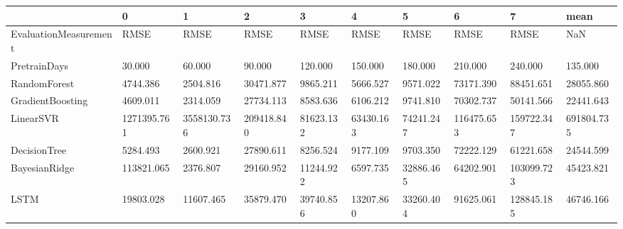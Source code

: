 \begin{tabular}{llllllllll}
\toprule
{} &           0 &           1 &          2 &         3 &         4 &         5 &          6 &          7 &       mean \\
\midrule
EvaluationMeasurement &        RMSE &        RMSE &       RMSE &      RMSE &      RMSE &      RMSE &       RMSE &       RMSE &        NaN \\
PretrainDays          &      30.000 &      60.000 &     90.000 &   120.000 &   150.000 &   180.000 &    210.000 &    240.000 &    135.000 \\
RandomForest          &    4744.386 &    2504.816 &  30471.877 &  9865.211 &  5666.527 &  9571.022 &  73171.390 &  88451.651 &  28055.860 \\
GradientBoosting      &    4609.011 &    2314.059 &  27734.113 &  8583.636 &  6106.212 &  9741.810 &  70302.737 &  50141.566 &  22441.643 \\
LinearSVR             & 1271395.761 & 3558130.736 & 209418.840 & 81623.132 & 63430.163 & 74241.247 & 116475.653 & 159722.347 & 691804.735 \\
DecisionTree          &    5284.493 &    2600.921 &  27890.611 &  8256.524 &  9177.109 &  9703.350 &  72222.129 &  61221.658 &  24544.599 \\
BayesianRidge         &  113821.065 &    2376.807 &  29160.952 & 11244.922 &  6597.735 & 32886.465 &  64202.901 & 103099.723 &  45423.821 \\
LSTM                  &   19803.028 &   11607.465 &  35879.470 & 39740.856 & 13207.860 & 33260.404 &  91625.061 & 128845.185 &  46746.166 \\
\bottomrule
\end{tabular}
